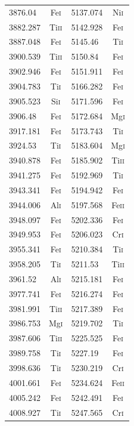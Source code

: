 \begin{longtable}[c]{|l|c|l|c|}
3876.04 & Fe\textsc{i} & 5137.074 & Ni\textsc{i}\\   
3882.287 & Ti\textsc{ii} & 5142.928 & Fe\textsc{i}\\ 
3887.048 & Fe\textsc{i} & 5145.46 & Ti\textsc{i}\\   
3900.539 & Ti\textsc{ii} & 5150.84 & Fe\textsc{i}\\  
3902.946 & Fe\textsc{i} & 5151.911 & Fe\textsc{i}\\  
3904.783 & Ti\textsc{i} & 5166.282 & Fe\textsc{i}\\  
3905.523 & Si\textsc{i} & 5171.596 & Fe\textsc{i}\\  
3906.48 & Fe\textsc{i} & 5172.684 & Mg\textsc{i}\\   
3917.181 & Fe\textsc{i} & 5173.743 & Ti\textsc{i}\\  
3924.53 & Ti\textsc{i} & 5183.604 & Mg\textsc{i}\\   
3940.878 & Fe\textsc{i} & 5185.902 & Ti\textsc{ii}\\ 
3941.275 & Fe\textsc{i} & 5192.969 & Ti\textsc{i}\\  
3943.341 & Fe\textsc{i} & 5194.942 & Fe\textsc{i}\\  
3944.006 & Al\textsc{i} & 5197.568 & Fe\textsc{ii}\\ 
3948.097 & Fe\textsc{i} & 5202.336 & Fe\textsc{i}\\  
3949.953 & Fe\textsc{i} & 5206.023 & Cr\textsc{i}\\  
3955.341 & Fe\textsc{i} & 5210.384 & Ti\textsc{i}\\  
3958.205 & Ti\textsc{i} & 5211.53 & Ti\textsc{ii}\\  
3961.52 & Al\textsc{i} & 5215.181 & Fe\textsc{i}\\   
3977.741 & Fe\textsc{i} & 5216.274 & Fe\textsc{i}\\  
3981.991 & Ti\textsc{ii} & 5217.389 & Fe\textsc{i}\\ 
3986.753 & Mg\textsc{i} & 5219.702 & Ti\textsc{i}\\  
3987.606 & Ti\textsc{ii} & 5225.525 & Fe\textsc{i}\\ 
3989.758 & Ti\textsc{i} & 5227.19 & Fe\textsc{i}\\   
3998.636 & Ti\textsc{i} & 5230.219 & Cr\textsc{i}\\  
4001.661 & Fe\textsc{i} & 5234.624 & Fe\textsc{ii}\\ 
4005.242 & Fe\textsc{i} & 5242.491 & Fe\textsc{i}\\  
4008.927 & Ti\textsc{i} & 5247.565 & Cr\textsc{i}\\  

\end{longtable}
